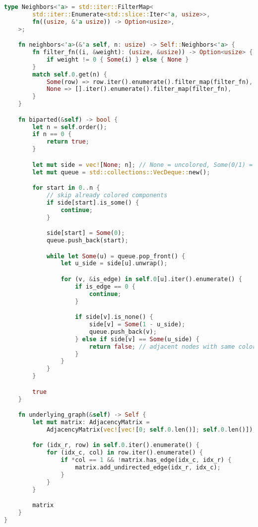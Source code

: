 \begin{lstlisting}[language=Rust, caption={Implementação de Graph na Estrutura de Dados Matriz de Adjacência}, label=list:impl_adj_mat_g]
    type Neighbors<'a> = std::iter::FilterMap<
        std::iter::Enumerate<std::slice::Iter<'a, usize>>,
        fn((usize, &'a usize)) -> Option<usize>,
    >;

    fn neighbors<'a>(&'a self, n: usize) -> Self::Neighbors<'a> {
        fn filter_fn((i, &weight): (usize, &usize)) -> Option<usize> {
            if weight != 0 { Some(i) } else { None }
        }
        match self.0.get(n) {
            Some(row) => row.iter().enumerate().filter_map(filter_fn),
            None => [].iter().enumerate().filter_map(filter_fn),
        }
    }

    fn biparted(&self) -> bool {
        let n = self.order();
        if n == 0 {
            return true;
        }

        let mut side = vec![None; n]; // None = uncolored, Some(0/1) = partition
        let mut queue = std::collections::VecDeque::new();

        for start in 0..n {
            // skip already colored components
            if side[start].is_some() {
                continue;
            }

            side[start] = Some(0);
            queue.push_back(start);

            while let Some(u) = queue.pop_front() {
                let u_side = side[u].unwrap();

                for (v, &is_edge) in self.0[u].iter().enumerate() {
                    if is_edge == 0 {
                        continue;
                    }

                    if side[v].is_none() {
                        side[v] = Some(1 - u_side);
                        queue.push_back(v);
                    } else if side[v] == Some(u_side) {
                        return false; // adjacent nodes with same color
                    }
                }
            }
        }

        true
    }

    fn underlying_graph(&self) -> Self {
        let mut matrix: AdjacencyMatrix =
            AdjacencyMatrix(vec![vec![0; self.0.len()]; self.0.len()]);

        for (idx_r, row) in self.0.iter().enumerate() {
            for (idx_c, col) in row.iter().enumerate() {
                if *col == 1 && !matrix.has_edge(idx_c, idx_r) {
                    matrix.add_undirected_edge(idx_r, idx_c);
                }
            }
        }

        matrix
    }
}
\end{lstlisting}

